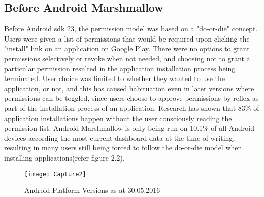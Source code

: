 \subsection{Before Android Marshmallow}
Before Android sdk 23, the permission model was based on a "do-or-die" concept. Users were given a list of permissions that would be required upon clicking the "install" link on an application on Google Play. There were no options to grant permissions selectively or revoke when not needed, and choosing not to grant a particular permission resulted in the application installation process being terminated\cite{felt2011effectiveness}. User choice was limited to whether they wanted to use the application, or not, and this has caused habituation even in later versions where permissions can be toggled\cite{wijesekera2015android}, since users choose to approve permissions by reflex as part of the installation process of an application. Research has shown that 83\% of application installations happen without the user consciously reading the permission list\cite{felt2012android}. Android Marshmallow is only being run on 10.1\% of all Android devices according the most current dashboard data at the time of writing\cite{androdashboard}, resulting in many users still being forced to follow the do-or-die model when installing applications(refer figure 2.2). 
\smallskip
\begin{figure}
\texttt{[image: Capture2]}
\caption{Android Platform Versions as at 30.05.2016\cite{androdashboard}}
\end{figure}
\smallskip

